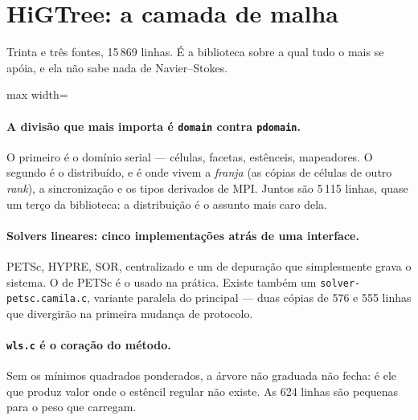 \section{HiGTree: a camada de malha}

Trinta e tr\^es fontes, 15\,869 linhas. \'E a biblioteca sobre a qual tudo o mais
se ap\'oia, e ela n\~ao sabe nada de Navier--Stokes.

\begin{adjustbox}{max width=\linewidth}
\end{adjustbox}

\paragraph{A divis\~ao que mais importa \'e \texttt{domain} contra
\texttt{pdomain}.} O primeiro \'e o dom\'inio serial --- c\'elulas, facetas,
estênceis, mapeadores. O segundo \'e o distribu\'ido, e \'e onde vivem a
\emph{franja} (as c\'opias de c\'elulas de outro \emph{rank}), a
sincroniza\c{c}\~ao e os tipos derivados de MPI. Juntos s\~ao
5\,115 linhas, quase um ter\c{c}o da biblioteca: a distribui\c{c}\~ao \'e o
assunto mais caro dela.

\paragraph{Solvers lineares: cinco implementa\c{c}\~oes atr\'as de uma
interface.} PETSc, HYPRE, SOR, centralizado e um de depura\c{c}\~ao que
simplesmente grava o sistema. O de PETSc \'e o usado na pr\'atica. Existe
tamb\'em um \texttt{solver-\allowbreak{}petsc.\allowbreak{}camila.\allowbreak{}c}, variante paralela do principal ---
duas c\'opias de 576 e 555 linhas que divergir\~ao na primeira mudan\c{c}a de
protocolo.

\paragraph{\texttt{wls.c} \'e o cora\c{c}\~ao do m\'etodo.} Sem os m\'inimos
quadrados ponderados, a \'arvore n\~ao graduada n\~ao fecha: \'e ele que produz
valor onde o estêncil regular n\~ao existe. As 624 linhas s\~ao pequenas para o
peso que carregam.
